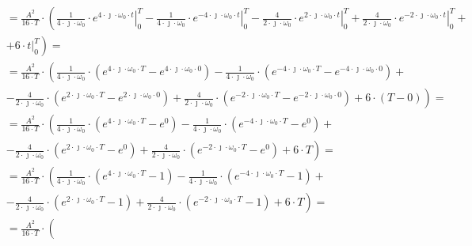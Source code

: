 \begin{task}
\begin{align*}
&=\frac{A^2}{16 \cdot T} \cdot \left( \frac{1}{4 \cdot \jmath \cdot \omega_0}\cdot \left. 
e^{4 \cdot \jmath \cdot \omega_0 \cdot t} \right|_{0}^{T} 
- \frac{1}{4 \cdot \jmath \cdot \omega_0}\cdot \left. e^{-4 \cdot \jmath \cdot \omega_0 \cdot t} \right|_{0}^{T}
- \frac{4}{2 \cdot \jmath \cdot \omega_0}\cdot \left. e^{2 \cdot \jmath \cdot \omega_0 \cdot t} \right|_{0}^{T}
+ \frac{4}{2 \cdot \jmath \cdot \omega_0}\cdot \left. e^{-2 \cdot \jmath \cdot \omega_0 \cdot t} \right|_{0}^{T}\right.+\\
&\left.+ 6 \cdot \left. t \right|_{0}^{T}\right)=\\
&=\frac{A^2}{16 \cdot T} \cdot \left( \frac{1}{4 \cdot \jmath \cdot \omega_0}\cdot \left( 
e^{4 \cdot \jmath \cdot \omega_0 \cdot T} -  
e^{4 \cdot \jmath \cdot \omega_0 \cdot 0} \right)
- \frac{1}{4 \cdot \jmath \cdot \omega_0}\cdot \left( e^{-4 \cdot \jmath \cdot \omega_0 \cdot T} - e^{-4 \cdot \jmath \cdot \omega_0 \cdot 0} \right)\right.+\\
&\left.- \frac{4}{2 \cdot \jmath \cdot \omega_0}\cdot \left( e^{2 \cdot \jmath \cdot \omega_0 \cdot T} -e^{2 \cdot \jmath \cdot \omega_0 \cdot 0}\right)
+ \frac{4}{2 \cdot \jmath \cdot \omega_0}\cdot \left( e^{-2 \cdot \jmath \cdot \omega_0 \cdot T} -e^{-2 \cdot \jmath \cdot \omega_0 \cdot 0}\right)
+ 6 \cdot \left(T - 0 \right)\right)=\\
&=\frac{A^2}{16 \cdot T} \cdot \left( \frac{1}{4 \cdot \jmath \cdot \omega_0}\cdot \left( 
e^{4 \cdot \jmath \cdot \omega_0 \cdot T} -  
e^{0} \right)
- \frac{1}{4 \cdot \jmath \cdot \omega_0}\cdot \left( e^{-4 \cdot \jmath \cdot \omega_0 \cdot T} - e^{0} \right)\right.+\\
&\left.- \frac{4}{2 \cdot \jmath \cdot \omega_0}\cdot \left( e^{2 \cdot \jmath \cdot \omega_0 \cdot T} -e^{0}\right)
+ \frac{4}{2 \cdot \jmath \cdot \omega_0}\cdot \left( e^{-2 \cdot \jmath \cdot \omega_0 \cdot T} -e^{0}\right)
+ 6 \cdot T \right)=\\
&=\frac{A^2}{16 \cdot T} \cdot \left( \frac{1}{4 \cdot \jmath \cdot \omega_0}\cdot \left( 
e^{4 \cdot \jmath \cdot \omega_0 \cdot T} - 1 \right)
- \frac{1}{4 \cdot \jmath \cdot \omega_0}\cdot \left( e^{-4 \cdot \jmath \cdot \omega_0 \cdot T} - 1 \right)\right.+\\
&\left.- \frac{4}{2 \cdot \jmath \cdot \omega_0}\cdot \left( e^{2 \cdot \jmath \cdot \omega_0 \cdot T} -1\right)
+ \frac{4}{2 \cdot \jmath \cdot \omega_0}\cdot \left( e^{-2 \cdot \jmath \cdot \omega_0 \cdot T} -1\right)
+ 6 \cdot T \right)=\\
&=\frac{A^2}{16 \cdot T} \cdot \left( 

\end{align*}
\end{task}
